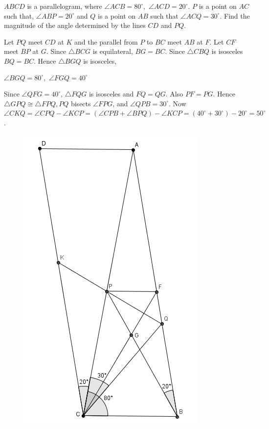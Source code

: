\documentclass{subfile}
\begin{document}
	\begin{problem} $ABCD$ is a parallelogram, where $\angle ACB=80^{\circ} ,$ $\angle ACD=20^{\circ}$. $P$ is a point on $AC$ such that, $\angle ABP=20^{\circ}$ and $Q$ is a point on $AB$ such that $\angle ACQ=30^{\circ}$. Find the magnitude of the angle determined by the lines $CD$ and $PQ$.
	\end{problem}

	\begin{solution}Let $PQ$ meet $CD$ at $K$ and the parallel from $P$ to $BC$ meet $AB$ at $F$. Let $CF$ meet $BP$ at $G$.
	Since $\triangle BCG$ is equilateral, $BG=BC$. Since $\triangle CBQ$ is isosceles $BQ=BC$. Hence $\triangle BGQ$ is isosceles,
	\begin{center}
		$\angle BGQ=80^{\circ},$ $\angle FGQ=40^{\circ}$
	\end{center}
	Since $\angle QFG=40^{\circ}$, $\triangle FQG$ is isosceles and $FQ=QG$. Also $PF=PG$. Hence $\triangle GPQ\cong \triangle FPQ, PQ$ bisects $\angle FPG$, and $\angle QPB=30^{\circ}$.
	Now $\angle CKQ=\angle CPQ-\angle KCP=(\angle CPB+\angle BPQ)-\angle KCP=(40^{\circ}+30^{\circ})-20^{\circ}=50^{\circ}$.\\
	\begin{figure}[h]
		\centering
		\includegraphics[width=0.4\linewidth, height=0.35\textheight]{Prob6.PNG}
	\end{figure}

	\end{solution}
\end{document}
